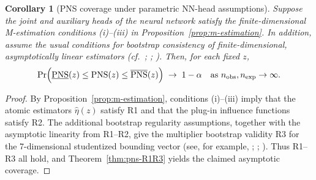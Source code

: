 \documentclass[accepted]{uai2026} %
\theoremstyle{plain}
\newtheorem{corollary}[theorem]{Corollary}
\theoremstyle{definition}
\theoremstyle{remark}
\begin{document}
\begin{corollary}[PNS coverage under parametric NN-head assumptions]
\label{cor:pns-parametric}
Suppose the joint and auxiliary heads of the neural network satisfy the
finite-dimensional M-estimation conditions (i)--(iii) in
Proposition~\ref{prop:m-estimation}. In addition, assume the usual conditions
for bootstrap consistency of finite-dimensional, asymptotically linear
estimators (cf.\ \citep{vandervaart1998asymptotic}; \citep{vandervaart1996weak};
\citep{chernozhukov2013gaussian}). Then, for each fixed $z$,
\begin{equation}
\label{eq:pointwise-coverage}
  \Pr\Bigl(
    \underline{\mathrm{PNS}}(z)
    \le \mathrm{PNS}(z)
    \le \overline{\mathrm{PNS}}(z)
  \Bigr)
  \;\to\; 1 - \alpha
  \quad \text{as } n_{\mathrm{obs}}, n_{\mathrm{exp}} \to \infty.
\end{equation}
\end{corollary}

\begin{proof}
By Proposition~\ref{prop:m-estimation}, conditions (i)--(iii) imply that the
atomic estimators $\hat\eta(z)$ satisfy R1 and that the plug-in influence
functions satisfy R2. The additional bootstrap regularity assumptions, together
with the asymptotic linearity from R1--R2, give the multiplier bootstrap
validity R3 for the 7-dimensional studentized bounding vector
(see, for example, \citep{vandervaart1998asymptotic}; \citep{vandervaart1996weak};
\citep{chernozhukov2013gaussian}). Thus R1--R3 all hold, and
Theorem~\ref{thm:pns-R1R3} yields the claimed asymptotic coverage.
\end{proof}
\end{document}
